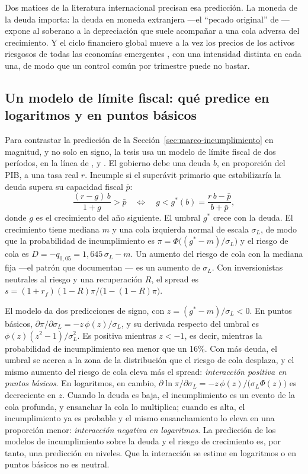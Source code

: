 Dos matices de la literatura internacional precisan esa predicción. La moneda de la deuda importa: la deuda en moneda extranjera ---el ``pecado original'' de \citet{EichengreenHausmann1999}--- expone al soberano a la depreciación que suele acompañar a una cola adversa del crecimiento. Y el ciclo financiero global mueve a la vez los precios de los activos riesgosos de todas las economías emergentes \citep{Rey2013}, con una intensidad distinta en cada una, de modo que un control común por trimestre puede no bastar.

\subsection{Un modelo de límite fiscal: qué predice en logaritmos y en puntos básicos}
\label{sec:modelo-limite}

Para contrastar la predicción de la Sección~\ref{sec:marco-incumplimiento} en magnitud, y no solo en signo, la tesis usa un modelo de límite fiscal de dos períodos, en la línea de \citet{EatonGersovitz1981}, \citet{Bi2012} y \citet{GhoshEtAl2013}. El gobierno debe una deuda $b$, en proporción del PIB, a una tasa real $r$. Incumple si el superávit primario que estabilizaría la deuda supera su capacidad fiscal $\bar p$:
\begin{equation}
\frac{(r-g)\,b}{1+g}>\bar p \quad\Longleftrightarrow\quad g<g^*(b)=\frac{r\,b-\bar p}{b+\bar p},
\label{eq:limite}
\end{equation}
donde $g$ es el crecimiento del año siguiente. El umbral $g^*$ crece con la deuda. El crecimiento tiene mediana $m$ y una cola izquierda normal de escala $\sigma_L$, de modo que la probabilidad de incumplimiento es $\pi=\Phi\big((g^*-m)/\sigma_L\big)$ y el riesgo de cola es $D=-q_{0,05}=1{,}645\,\sigma_L-m$. Un aumento del riesgo de cola con la mediana fija ---el patrón que documentan \citet{ABG2019b}--- es un aumento de $\sigma_L$. Con inversionistas neutrales al riesgo y una recuperación $R$, el spread es $s=(1+r_f)(1-R)\pi/\big(1-(1-R)\pi\big)$.

El modelo da dos predicciones de signo, con $z=(g^*-m)/\sigma_L<0$. En puntos básicos, $\partial\pi/\partial\sigma_L=-z\,\phi(z)/\sigma_L$, y su derivada respecto del umbral es $\phi(z)(z^2-1)/\sigma_L^2$. Es positiva mientras $z<-1$, es decir, mientras la probabilidad de incumplimiento sea menor que un 16\%. Con más deuda, el umbral se acerca a la zona de la distribución que el riesgo de cola desplaza, y el mismo aumento del riesgo de cola eleva más el spread: \emph{interacción positiva en puntos básicos}. En logaritmos, en cambio, $\partial\ln\pi/\partial\sigma_L=-z\,\phi(z)/\big(\sigma_L\Phi(z)\big)$ es decreciente en $z$. Cuando la deuda es baja, el incumplimiento es un evento de la cola profunda, y ensanchar la cola lo multiplica; cuando es alta, el incumplimiento ya es probable y el mismo ensanchamiento lo eleva en una proporción menor: \emph{interacción negativa en logaritmos}. La predicción de los modelos de incumplimiento sobre la deuda y el riesgo de crecimiento es, por tanto, una predicción en niveles. Que la interacción se estime en logaritmos o en puntos básicos no es neutral.


